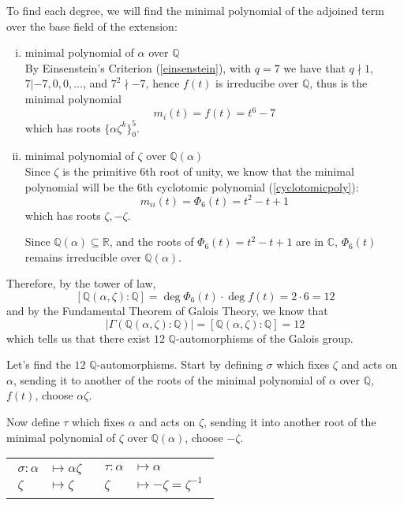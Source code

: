 \documentclass{article}
\theoremstyle{definition}
\begin{document}
To find each degree, we will find the minimal polynomial of the adjoined term over the base field of the extension:

\begin{enumerate}[i.]
  \item minimal polynomial of $\alpha$ over $\mathbb{Q}$\\
    By Einsenstein's Criterion (\ref{einsenstein}), with $q=7$ we have that $q
    \nmid 1$, $7 | {-7,0,0,\ldots}$, and $7^2 \nmid -7$, hence $f(t)$ is
    irreducibe over $\mathbb{Q}$, thus is the minimal polynomial
    $$m_i(t)= f(t) =t^6-7$$
    which has roots $\{ \alpha \zeta^k \}_0^5$.
  \item minimal polynomial of $\zeta$ over $\mathbb{Q}(\alpha)$\\
    Since $\zeta$ is the primitive $6$th root of unity, we know that the minimal
    polynomial will be the $6$th cyclotomic polynomial (\ref{cyclotomicpoly}):
    $$m_{ii}(t) = \Phi_6(t) = t^2 - t + 1$$
    which has roots $\zeta, -\zeta$.

    Since $\mathbb{Q}(\alpha) \subseteq \mathbb{R}$, and the roots of
    $\Phi_6(t)=t^2 - t +1$ are in $\mathbb{C}$, $\Phi_6(t)$ remains irreducible
    over $\mathbb{Q}(\alpha)$.
\end{enumerate}

\vspace{0.5cm}
Therefore, by the tower of law,
$$[\mathbb{Q}(\alpha, \zeta) : \mathbb{Q}] = \deg{\Phi_6(t)} \cdot \deg{f(t)} = 2 \cdot 6 = 12$$
and by the Fundamental Theorem of Galois Theory, we know that
$$|\Gamma( \mathbb{Q}(\alpha, \zeta) : \mathbb{Q} )| = [\mathbb{Q}(\alpha, \zeta) : \mathbb{Q}] = 12$$
which tells us that there exist $12$ $\mathbb{Q}$-automorphisms of the Galois group.


\vspace{0.5cm}
Let's find the $12$ $\mathbb{Q}$-automorphisms. Start by defining $\sigma$ which
fixes $\zeta$ and acts on $\alpha$, sending it to another of the roots of the
minimal polynomial of $\alpha$ over $\mathbb{Q}$, $f(t)$, choose $\alpha \zeta$.

Now define $\tau$ which fixes $\alpha$ and acts on $\zeta$, sending it into
another root of the minimal polynomial of $\zeta$ over $\mathbb{Q}(\alpha)$,
choose $-\zeta$.

\vspace{0.3cm}
\begin{tabular}{@{}l l@{}}
    $\begin{aligned}
      \sigma: \alpha &\mapsto \alpha \zeta \\
      \zeta &\mapsto \zeta
    \end{aligned}$
  &
    $\begin{aligned}
      \tau: \alpha &\mapsto \alpha\\
      \zeta &\mapsto -\zeta = \zeta^{-1}
    \end{aligned}$
\end{tabular}
\end{document}
